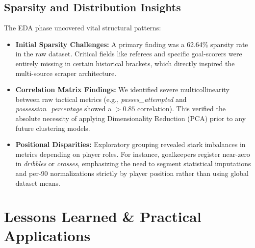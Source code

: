 \documentclass[12pt,a4paper]{article}
\begin{document}
\subsection{Sparsity and Distribution Insights}
The EDA phase uncovered vital structural patterns:
\begin{itemize}
    \item \textbf{Initial Sparsity Challenges:} A primary finding was a 62.64\% sparsity rate in the raw dataset. Critical fields like referees and specific goal-scorers were entirely missing in certain historical brackets, which directly inspired the multi-source scraper architecture.
    \item \textbf{Correlation Matrix Findings:} We identified severe multicollinearity between raw tactical metrics (e.g., \textit{passes\_attempted} and \textit{possession\_percentage} showed a $>0.85$ correlation). This verified the absolute necessity of applying Dimensionality Reduction (PCA) prior to any future clustering models.
    \item \textbf{Positional Disparities:} Exploratory grouping revealed stark imbalances in metrics depending on player roles. For instance, goalkeepers register near-zero in \textit{dribbles} or \textit{crosses}, emphasizing the need to segment statistical imputations and per-90 normalizations strictly by player position rather than using global dataset means.
\end{itemize}

\section{Lessons Learned \& Practical Applications}
\end{document}

